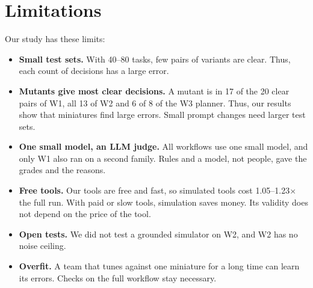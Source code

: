 \section{Limitations}
\label{sec:limits}

Our study has these limits:
\begin{itemize}
  \item \textbf{Small test sets.} With 40--80 tasks, few pairs of variants are clear. Thus, each
  count of decisions has a large error.
  \item \textbf{Mutants give most clear decisions.} A mutant is in 17 of the 20 clear pairs of W1,
  all 13 of W2 and 6 of 8 of the W3 planner. Thus, our results show that miniatures
  find large errors. Small prompt changes need larger test sets.
  \item \textbf{One small model, an LLM judge.} All workflows use one small model, and only W1 also
  ran on a second family. Rules and a model, not people, gave the grades and the reasons.
  \item \textbf{Free tools.} Our tools are free and fast, so simulated tools cost
  1.05--1.23$\times$ the full run. With paid or slow tools, simulation saves money. Its validity
  does not depend on the price of the tool.
  \item \textbf{Open tests.} We did not test a grounded simulator on W2, and W2 has no noise
  ceiling.
  \item \textbf{Overfit.} A team that tunes against one miniature for a long time can learn its
  errors. Checks on the full workflow stay necessary.
\end{itemize}
